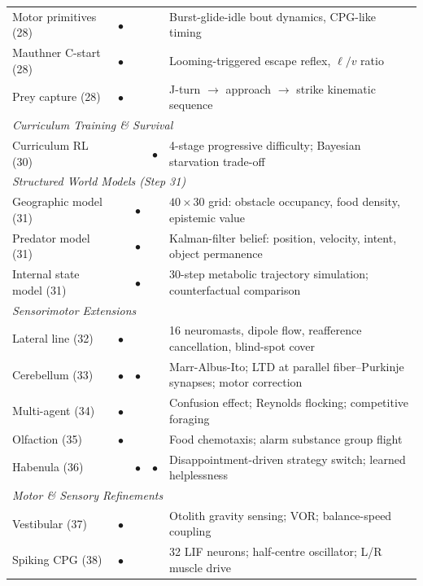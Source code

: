 \documentclass[11pt,a4paper]{article}
\begin{document}
\begin{table}[H]
\begin{tabular}{lcccp{5.8cm}}
Motor primitives (28)             & $\bullet$ &           &           & Burst-glide-idle bout dynamics, CPG-like timing \\
Mauthner C-start (28)             & $\bullet$ &           &           & Looming-triggered escape reflex, $\ell/v$ ratio \\
Prey capture (28)                 & $\bullet$ &           &           & J-turn $\to$ approach $\to$ strike kinematic sequence \\
\midrule
\multicolumn{5}{l}{\textit{Curriculum Training \& Survival}} \\
Curriculum RL (30)                & & & $\bullet$ & 4-stage progressive difficulty; Bayesian starvation trade-off \\
\midrule
\multicolumn{5}{l}{\textit{Structured World Models (Step 31)}} \\
Geographic model (31)             & & $\bullet$ & & $40\times30$ grid: obstacle occupancy, food density, epistemic value \\
Predator model (31)               & & $\bullet$ & & Kalman-filter belief: position, velocity, intent, object permanence \\
Internal state model (31)         & & $\bullet$ & & 30-step metabolic trajectory simulation; counterfactual comparison \\
\midrule
\multicolumn{5}{l}{\textit{Sensorimotor Extensions}} \\
Lateral line (32)                 & $\bullet$ & & & 16 neuromasts, dipole flow, reafference cancellation, blind-spot cover \\
Cerebellum (33)                   & $\bullet$ & $\bullet$ & & Marr-Albus-Ito; LTD at parallel fiber--Purkinje synapses; motor correction \\
Multi-agent (34)                  & $\bullet$ & & & Confusion effect; Reynolds flocking; competitive foraging \\
Olfaction (35)                    & $\bullet$ & & & Food chemotaxis; alarm substance group flight \\
Habenula (36)                     & & $\bullet$ & $\bullet$ & Disappointment-driven strategy switch; learned helplessness \\
\midrule
\multicolumn{5}{l}{\textit{Motor \& Sensory Refinements}} \\
Vestibular (37)                   & $\bullet$ & & & Otolith gravity sensing; VOR; balance-speed coupling \\
Spiking CPG (38)                  & $\bullet$ & & & 32 LIF neurons; half-centre oscillator; L/R muscle drive \\

\end{tabular}
\end{table}
\end{document}
